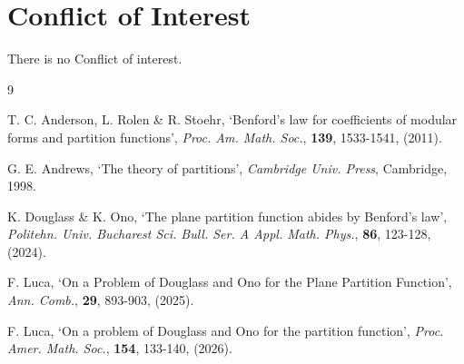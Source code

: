 \documentclass[12pt]{amsart}
\numberwithin{equation}{section}
\begin{document}
\section*{Conflict of Interest}
There is no Conflict of interest.
\begin{thebibliography}{9}

 T. C. Anderson, L. Rolen \& R. Stoehr, `Benford’s law for coefficients of modular forms and partition functions',  {\it Proc. Am. Math. Soc.}, {\bf 139}, 1533-1541, (2011).

 G. E. Andrews, `The theory of partitions', {\it Cambridge Univ. Press}, Cambridge, 1998.

 K. Douglass \& K. Ono, `The plane partition function abides by Benford’s law', {\it Politehn. Univ. Bucharest Sci. Bull. Ser. A Appl. Math. Phys.}, {\bf 86}, 123-128, (2024).

 F. Luca, `On a Problem of Douglass and Ono for the Plane Partition Function', {\it Ann. Comb.}, {\bf 29}, 893-903, (2025).

 F. Luca, `On a problem of Douglass and Ono for the partition function', {\it Proc. Amer. Math. Soc.}, {\bf 154}, 133-140, (2026).

\end{thebibliography} 
\end{document}
